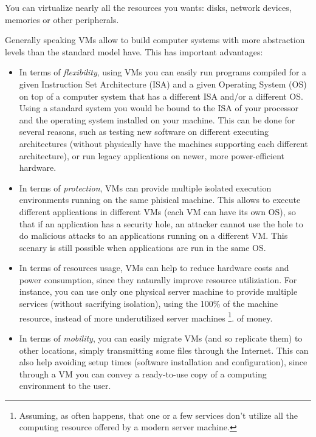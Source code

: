 You can virtualize nearly all the resources you wants: disks, network devices, memories or other peripherals.

\vspace{0.5cm}

Generally speaking VMs allow to build computer systems with more abstraction levels than the standard model have. This has important
advantages:
\begin{itemize}
  \item In terms of \emph{flexibility}, using VMs you can easily run programs compiled for a given Instruction Set Architecture (ISA) 
	and a given Operating System (OS) on top of a computer system that has a different ISA and/or a different OS. Using a standard
	system you would be bound to the ISA of your processor and the operating system installed on your machine. This can be 
	done for several reasons, such as testing new software on different executing architectures (without physically have the
	machines supporting each different architecture), or run legacy applications on newer, more power-efficient hardware.

  \item In terms of \emph{protection}, VMs can provide multiple isolated execution environments running on the same phisical machine.
	This allows to execute different applications in different VMs (each VM can have its own OS), so that if an application has a
	security hole, an attacker cannot use the hole to do malicious attacks to an applications running on a different VM. 
	This scenary is still possible when applications are run in the same OS.
	
  \item In terms of resources usage, VMs can help to reduce hardware costs and power consumption, since they naturally improve 
	resource utiliziation. For instance, you can use only one physical server machine to provide multiple services (without 
	sacrifying isolation), using the 100\% of the machine resource, instead of more underutilized server machines
	\footnote{Assuming, as often happens, that one or a few services don't utilize all the computing resource offered by
	a modern server machine.}.
	of money.
	
  \item In terms of \emph{mobility}, you can easily migrate VMs (and so replicate them) to other locations, simply transmitting 
	some files through the Internet. This can also help avoiding setup times (software installation and configuration), 
	since through a VM you can convey a ready-to-use copy of a computing environment to the user.
\end{itemize}

